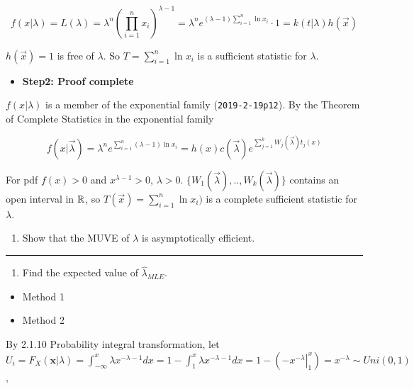 \documentclass[12pt,]{article}
\providecommand{\tightlist}{%
  \setlength{\itemsep}{0pt}\setlength{\parskip}{0pt}}
\begin{document}
\[f(x|\lambda)=L(\lambda)=\lambda^n(\prod_{i=1}^n x_i)^{\lambda-1}=\lambda^ne^{(\lambda-1)\sum^n_{i=1} \ln x_i}\cdot1=k(t|\lambda)h(\vec x)\]

\(h(\vec x)=1\) is free of \(\lambda\). So \(T=\sum^n_{i=1} \ln x_i\) is
a sufficient statistic for \(\lambda\).

\begin{itemize}
\tightlist
\item
  \textbf{Step2: Proof complete}
\end{itemize}

\(f(x|\lambda)\) is a member of the exponential family
(\texttt{2019-2-19p12}). By the Theorem of Complete Statistics in the
exponential family

\[f(x|\vec\lambda)=\lambda^ne^{\sum^n_{i=1} (\lambda-1)\ln x_i}=h(x)c(\vec \lambda)e^{\sum^k_{j=1}W_j(\vec \lambda)t_j(x)}\]

For pdf \(f(x)>0\) and \(x^{\lambda-1}>0\), \(\lambda>0\).
\(\{W_1(\vec \lambda),..,W_k(\vec \lambda)\}\) contains an open interval
in \(\Bbb R\), so \(T(\vec x)=\sum^n_{i=1} \ln x_i)\) is a complete
sufficient statistic for \(\lambda\).

\begin{enumerate}
\def\labelenumi{\arabic{enumi}.}
\setcounter{enumi}{5}
\tightlist
\item
  \textcolor[rgb]{0.7,0.7,0.7}{Show that the MUVE of $\lambda$ is asymptotically efficient.}
\end{enumerate}

\begin{center}\rule{0.5\linewidth}{\linethickness}\end{center}

\begin{enumerate}
\def\labelenumi{\alph{enumi}.}
\setcounter{enumi}{1}
\tightlist
\item
  \textcolor[rgb]{0.7,0.7,0.7}{Find the expected value of $\hat\lambda_{MLE}$.}
\end{enumerate}

\begin{itemize}
\item
  Method 1
\item
  Method 2
\end{itemize}

By 2.1.10 Probability integral transformation, let
\(U_i=F_X(\mathbf{x}|\lambda)=\int_{-\infty}^x\lambda x^{-\lambda-1}dx=1-\int_1^{x}\lambda x^{-\lambda-1}dx=1-(\left.-x^{-\lambda}\right|_{1}^x)=x^{-\lambda} \sim Uni(0,1)\),
\end{document}
